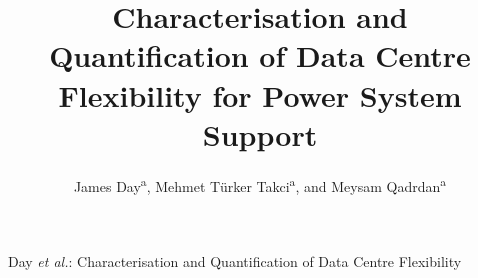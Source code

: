 \documentclass[lettersize,journal]{IEEEtran}
\begin{document}
\title{Characterisation and Quantification of Data Centre Flexibility for Power System Support}

\author{ James Day\textsuperscript{a}, Mehmet Türker Takci\textsuperscript{a}, and Meysam Qadrdan\textsuperscript{a}}


\maketitle

%
{Day \MakeLowercase{\textit{et al.}}: Characterisation and Quantification of Data Centre Flexibility}
\end{document}
